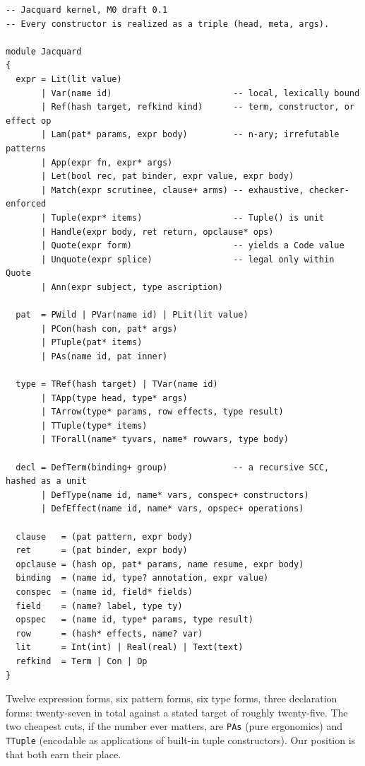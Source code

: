 \documentclass[11pt]{article}
\begin{document}
\begin{lstlisting}
-- Jacquard kernel, M0 draft 0.1
-- Every constructor is realized as a triple (head, meta, args).

module Jacquard
{
  expr = Lit(lit value)
       | Var(name id)                        -- local, lexically bound
       | Ref(hash target, refkind kind)      -- term, constructor, or effect op
       | Lam(pat* params, expr body)         -- n-ary; irrefutable patterns
       | App(expr fn, expr* args)
       | Let(bool rec, pat binder, expr value, expr body)
       | Match(expr scrutinee, clause+ arms) -- exhaustive, checker-enforced
       | Tuple(expr* items)                  -- Tuple() is unit
       | Handle(expr body, ret return, opclause* ops)
       | Quote(expr form)                    -- yields a Code value
       | Unquote(expr splice)                -- legal only within Quote
       | Ann(expr subject, type ascription)

  pat  = PWild | PVar(name id) | PLit(lit value)
       | PCon(hash con, pat* args)
       | PTuple(pat* items)
       | PAs(name id, pat inner)

  type = TRef(hash target) | TVar(name id)
       | TApp(type head, type* args)
       | TArrow(type* params, row effects, type result)
       | TTuple(type* items)
       | TForall(name* tyvars, name* rowvars, type body)

  decl = DefTerm(binding+ group)             -- a recursive SCC, hashed as a unit
       | DefType(name id, name* vars, conspec+ constructors)
       | DefEffect(name id, name* vars, opspec+ operations)

  clause   = (pat pattern, expr body)
  ret      = (pat binder, expr body)
  opclause = (hash op, pat* params, name resume, expr body)
  binding  = (name id, type? annotation, expr value)
  conspec  = (name id, field* fields)
  field    = (name? label, type ty)
  opspec   = (name id, type* params, type result)
  row      = (hash* effects, name? var)
  lit      = Int(int) | Real(real) | Text(text)
  refkind  = Term | Con | Op
}
\end{lstlisting}

Twelve expression forms, six pattern forms, six type forms, three declaration forms: twenty-seven in total against a stated target of roughly twenty-five. The two cheapest cuts, if the number ever matters, are \texttt{PAs} (pure ergonomics) and \texttt{TTuple} (encodable as applications of built-in tuple constructors). Our position is that both earn their place.
\end{document}
